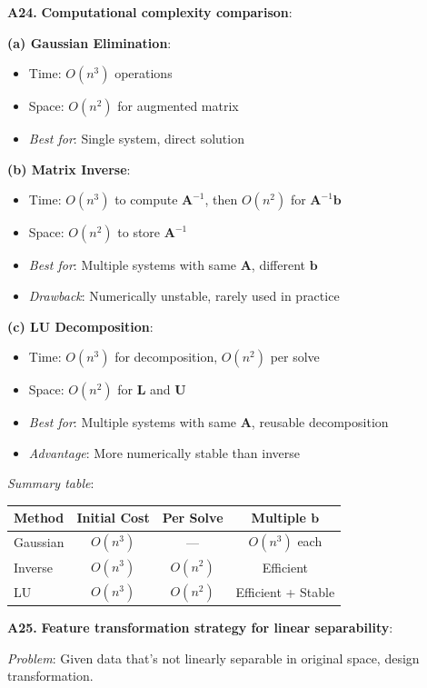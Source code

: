 \documentclass[12pt,a4paper]{article}
\theoremstyle{definition}
\begin{document}
\textbf{A24.} \textbf{Computational complexity comparison}:

\textbf{(a) Gaussian Elimination}:
\begin{itemize}
\item Time: $O(n^3)$ operations
\item Space: $O(n^2)$ for augmented matrix
\item \textit{Best for}: Single system, direct solution
\end{itemize}

\textbf{(b) Matrix Inverse}:
\begin{itemize}
\item Time: $O(n^3)$ to compute $\mathbf{A}^{-1}$, then $O(n^2)$ for $\mathbf{A}^{-1}\mathbf{b}$
\item Space: $O(n^2)$ to store $\mathbf{A}^{-1}$
\item \textit{Best for}: Multiple systems with same $\mathbf{A}$, different $\mathbf{b}$
\item \textit{Drawback}: Numerically unstable, rarely used in practice
\end{itemize}

\textbf{(c) LU Decomposition}:
\begin{itemize}
\item Time: $O(n^3)$ for decomposition, $O(n^2)$ per solve
\item Space: $O(n^2)$ for $\mathbf{L}$ and $\mathbf{U}$
\item \textit{Best for}: Multiple systems with same $\mathbf{A}$, reusable decomposition
\item \textit{Advantage}: More numerically stable than inverse
\end{itemize}

\textit{Summary table}:
\begin{center}
\begin{tabular}{lccc}
\hline
Method & Initial Cost & Per Solve & Multiple $\mathbf{b}$ \\
\hline
Gaussian & $O(n^3)$ & — & $O(n^3)$ each \\
Inverse & $O(n^3)$ & $O(n^2)$ & Efficient \\
LU & $O(n^3)$ & $O(n^2)$ & Efficient + Stable \\
\hline
\end{tabular}
\end{center}

\textbf{A25.} \textbf{Feature transformation strategy for linear separability}:

\textit{Problem}: Given data that's not linearly separable in original space, design transformation.
\end{document}
